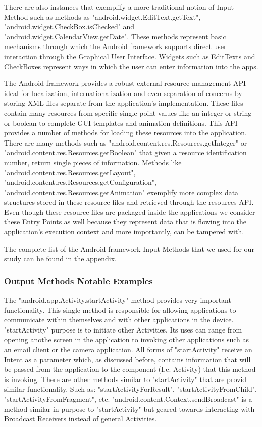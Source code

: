 \documentclass{sig-alternate}
\begin{document}
There are also instances that exemplify a more traditional notion of Input Method such as methods as "android.widget.\-EditText.\-getText", "android.widget.\-CheckBox.\-isChecked" and "android.widget.\-CalendarView.\-getDate". These methods represent basic mechanisms through which the Android framework supports direct user interaction through the Graphical User Interface. Widgets such as EditTexts and CheckBoxes represent ways in which the user can enter information into the apps.

The Android framework provides a robust external resource management API ideal for localization, internationalization and even separation of concerns by storing XML files separate from the application's implementation. These files contain many resources from specific single point values like an integer or string or boolean to complete GUI templates and animation definitions. This API provides a number of methods for loading these resources into the application. There are many methods such as "android.\-content.\-res.\-Resources.\-getInteger" or "android.\-content.\-res.\-Resources.\-getBoolean" that given a resource identification number, return single pieces of information. Methods like "android.\-content.\-res.\-Resources.\-getLayout", "android.\-content.\-res.\-Resources.\-getConfiguration", "android.\-content.\-res.\-Resources.\-getAnimation" exemplify more complex data structures stored in these resource files and retrieved through the resources API. Even though these resource files are packaged inside the applications we consider these Entry Points as well because they represent data that is flowing into the application’s execution context and more importantly, can be tampered with.

The complete list of the Android framework Input Methods that we used for our study can be found in the appendix.

\subsubsection{Output Methods Notable Examples}

The "android.app.\-Activity.\-startActivity" method provides very important functionality. This single method is responsible for allowing applications to communicate within themselves and with other applications in the device. "startActivity" purpose is to initiate other Activities. Its uses can range from opening anothe screen in the application to invoking other applications such as an email client or the camera application. All forms of "startActivity" receive an Intent as a parameter which, as discussed before, contains information that will be passed from the application to the component (I.e. Activity) that this method is invoking. There are other methods similar to "startActivity" that are provid similar functionality. Such as: "startActivityForResult", "startActivityFromChild", "startActivityFromFragment", etc. "android.content.Context.sendBroadcast" is a method similar in purpose to "startActivity" but geared towards interacting with Broadcast Receivers instead of general Activities.
\end{document}
